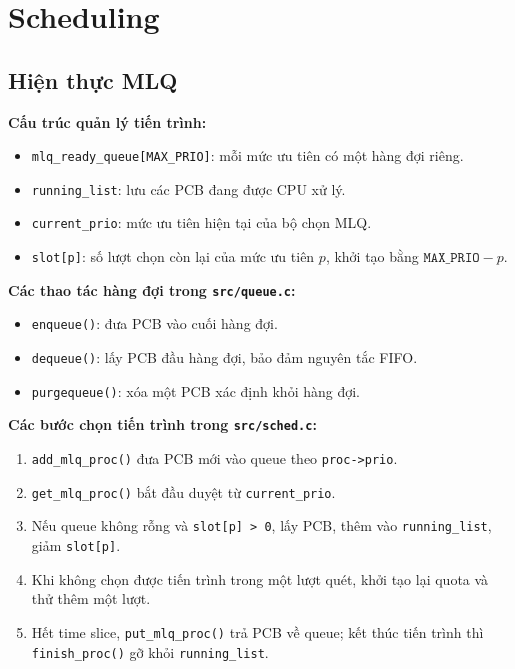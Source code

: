 \documentclass[12pt,a4paper]{article}
\begin{document}
	\section{Scheduling}
	\subsection{Hiện thực MLQ}

	\noindent\textbf{Cấu trúc quản lý tiến trình:}
	\begin{itemize}
	    \item \texttt{mlq\_ready\_queue[MAX\_PRIO]}: mỗi mức ưu tiên có một hàng đợi riêng.
	    \item \texttt{running\_list}: lưu các PCB đang được CPU xử lý.
	    \item \texttt{current\_prio}: mức ưu tiên hiện tại của bộ chọn MLQ.
	    \item \texttt{slot[p]}: số lượt chọn còn lại của mức ưu tiên \(p\), khởi tạo bằng \(\texttt{MAX\_PRIO}-p\).
	\end{itemize}

	\noindent\textbf{Các thao tác hàng đợi trong \texttt{src/queue.c}:}
	\begin{itemize}
	    \item \texttt{enqueue()}: đưa PCB vào cuối hàng đợi.
	    \item \texttt{dequeue()}: lấy PCB đầu hàng đợi, bảo đảm nguyên tắc FIFO.
	    \item \texttt{purgequeue()}: xóa một PCB xác định khỏi hàng đợi.
	\end{itemize}

	\noindent\textbf{Các bước chọn tiến trình trong \texttt{src/sched.c}:}
	\begin{enumerate}
	    \item \texttt{add\_mlq\_proc()} đưa PCB mới vào queue theo \texttt{proc->prio}.
	    \item \texttt{get\_mlq\_proc()} bắt đầu duyệt từ \texttt{current\_prio}.
	    \item Nếu queue không rỗng và \texttt{slot[p] > 0}, lấy PCB, thêm vào \texttt{running\_list}, giảm \texttt{slot[p]}.
	    \item Khi không chọn được tiến trình trong một lượt quét, khởi tạo lại quota và thử thêm một lượt.
	    \item Hết time slice, \texttt{put\_mlq\_proc()} trả PCB về queue; kết thúc tiến trình thì \texttt{finish\_proc()} gỡ khỏi \texttt{running\_list}.
	\end{enumerate}
\end{document}

